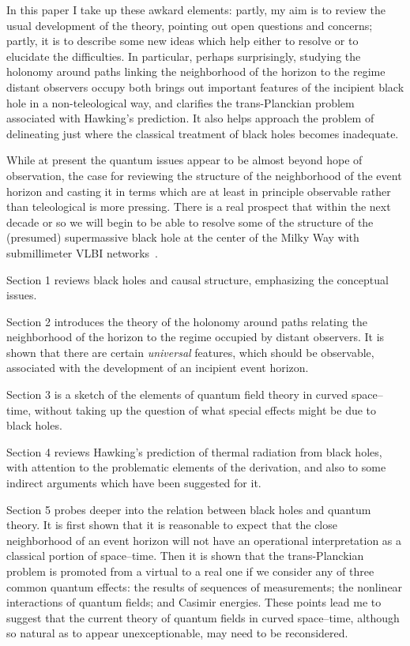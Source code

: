 \documentclass[
%
draft    %
,numberedheadings 
,bibliocites
  ]
  {aipproc}
\begin{document}
In this paper I take up these awkard elements:  partly, my aim is to review the usual development of the theory, pointing out open questions and concerns; partly, it is to describe some new ideas which help either to resolve or to elucidate the difficulties.  In particular, perhaps surprisingly, studying the holonomy around paths linking the neighborhood of the horizon to the regime distant observers occupy both brings out important features of the incipient black hole in a non-teleological way, and clarifies the trans-Planckian problem associated with Hawking's prediction.  It also helps approach the problem of delineating just where the classical treatment of black holes becomes inadequate.

While at present the quantum issues appear to be almost 
beyond hope of observation, the case for
reviewing the structure of the neighborhood of the event horizon and casting it in terms which are at least in principle observable rather than teleological is more pressing.  There is a real prospect that within the next decade or so we will begin to be able to resolve some of the structure of the (presumed) supermassive black hole at the center of the Milky Way with submillimeter VLBI networks~\citep{Doeleman:2009te}.

Section 1 reviews black holes and causal structure, emphasizing the conceptual issues.

Section 2 introduces the theory of the holonomy around paths relating the neighborhood of the horizon to the regime occupied by distant observers.  It is shown that there are certain {\em universal} features, which should be observable, associated with the development of an incipient event horizon.

Section 3 is a sketch of the elements of quantum field theory in curved space--time, without taking up the question of what special effects might be due to black holes.

Section 4 reviews Hawking's prediction of thermal radiation from black holes, with attention to the problematic elements of the derivation, and also to some indirect arguments which have been suggested for it.

Section 5 probes deeper into the relation between black holes and quantum theory.  It is first shown that it is reasonable to expect that the close neighborhood of an event horizon will not have an operational interpretation as a classical portion of space--time.  Then it is shown that the trans-Planckian problem is promoted from a virtual to a real one if we consider any of three common quantum effects:  the results of sequences of measurements; the nonlinear interactions of quantum fields; and Casimir energies.  These points lead me to suggest that the current theory of quantum fields in curved space--time, although so natural as to appear unexceptionable, may need to be reconsidered.
\end{document}

